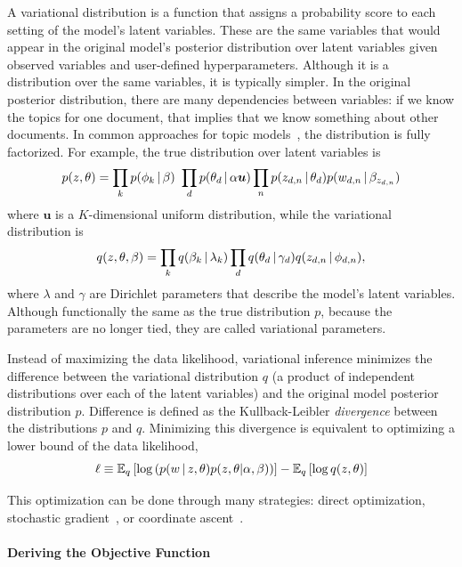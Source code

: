 A variational distribution is a function that assigns a probability score to each setting of the model's latent variables.
These are the same variables that would appear in the original model's posterior distribution over latent variables given observed variables and user-defined hyperparameters.
Although it is a distribution over the same variables, it is typically
simpler.  
In the original posterior distribution, there are many dependencies between variables: if we know the topics for one document, that implies that we know something about other documents.
In common approaches for topic models~\citep{blei-03}, the
distribution is fully factorized.  For example, the true distribution
over latent variables is
\begin{equation}
p(z, \theta) = \prod_k p(\phi_k \g \beta) \ \prod_d p(\theta_d \g
    \alpha {\bm u}) \prod_n p(z_{d,n} \g \theta_d) p(w_{d,n} \g
    \beta_{z_{d,n}})
\end{equation}
where ${\bm u}$ is a $K$-dimensional uniform distribution, while the variational distribution is
\begin{equation}
q(z, \theta, \beta) = \prod_k q(\beta_k \, | \, \lambda_k) \prod_d q(\theta_d
  \, | \, \gamma_d) q(z_{d,n} \, | \, \phi_{d,n}),
\end{equation}
where $\lambda$ and $\gamma$ are Dirichlet parameters that describe
the model's latent variables.
Although functionally the same as the
true distribution $p$, because the parameters are no longer tied,
they are called variational parameters.

Instead of maximizing the data likelihood, variational inference
minimizes the difference between the variational distribution $q$ (a product of independent distributions over each of the latent variables) and the original model posterior distribution $p$.
Difference is defined as the Kullback-Leibler
\emph{divergence} between the distributions $p$ and $q$.  Minimizing this divergence is
equivalent to optimizing a lower bound of the data likelihood,
\begin{equation}
  \ell \equiv \mathbb{E}_{q}\left[ \log \left(p(w \, | \, z, \theta) p(z, \theta | \alpha,
      \beta) \right)  \right] - \mathbb{E}_{q}\left[ \log q(z, \theta) \right]
\label{eq:obj}
\end{equation}

This optimization can be done through many strategies: direct
optimization, stochastic gradient~\citep{hoffman-10}, or coordinate
ascent~\citep{blei-03}.

\paragraph{Deriving the Objective Function}

